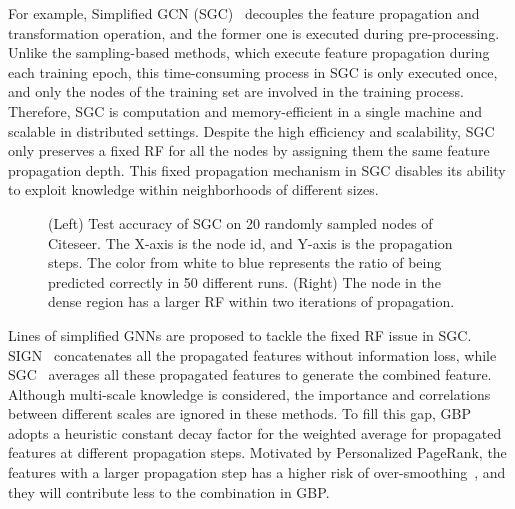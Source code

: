 \documentclass[sigconf]{acmart}
\begin{document}
For example, Simplified GCN (SGC)~\citep{wu2019simplifying} decouples the feature propagation and transformation operation, and the former one is executed during pre-processing.
Unlike the sampling-based methods, which execute feature propagation during each training epoch, this time-consuming process in SGC is only executed once, and only the nodes of the training set are involved in the training process.
Therefore, SGC is computation and memory-efficient in a single machine and scalable in distributed settings.
Despite the high efficiency and scalability, SGC only preserves a fixed RF for all the nodes by assigning them the same feature propagation depth.
This fixed propagation mechanism in SGC disables its ability to exploit knowledge within neighborhoods of different sizes. 



\begin{figure*}[tp!]
\vspace{-5mm}
\centering  
{}
\centering
{}
\vspace{-4mm}
\caption{  (Left) Test accuracy of SGC on 20 randomly sampled nodes of Citeseer. The X-axis is the node id, and Y-axis is the propagation steps. The color from white to blue represents the ratio of being predicted correctly in 50 different runs. (Right) The node in the dense region has a larger RF within two iterations of propagation.
}
\label{fig.observation}
\vspace{-4mm}
\end{figure*}




Lines of simplified GNNs are proposed to tackle the fixed RF issue in SGC.
SIGN~\citep{frasca2020sign} concatenates all the propagated features without information loss, while SGC~\citep{zhu2021simple} averages all these propagated features to generate the combined feature. 
Although multi-scale knowledge is considered, the importance and correlations between different scales are ignored in these methods. 
To fill this gap, GBP~\citep{DBLP:conf/nips/ChenWDL00W20} adopts a heuristic constant decay factor for the weighted average for propagated features at different propagation steps.
Motivated by Personalized PageRank, the features with a larger propagation step has a higher risk of over-smoothing~\citep{li2018deeper,xu2018representation}, and they will contribute less to the combination in GBP. 
\end{document}
